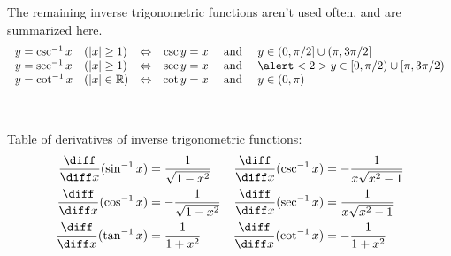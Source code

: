 \begin{frame}
The remaining inverse trigonometric functions aren't used often, and are summarized here.
\[
\begin{array}{llcrcl}
y = \csc^{-1} x &%
(|x| \geq 1) &%
\Leftrightarrow &%
\csc y = x &%
\text{ and } &%
y\in (0,\pi /2] \cup (\pi , 3\pi /2] \\%
y = \sec^{-1} x &%
(|x| \geq 1) &%
\Leftrightarrow &%
\sec y = x &%
\text{ and } &%
\alert<2>{y\in [0,\pi /2) \cup [\pi , 3\pi /2)} \\%
y = \cot^{-1} x &%
(|x| \in \mathbb{R}) &%
\Leftrightarrow &%
\cot y = x &%
\text{ and } &%
y\in (0,\pi )
\end{array}
\]

\ %
%
\end{frame}

\begin{frame}
Table of derivatives of inverse trigonometric functions: 
\begin{align*}
\frac{\diff}{\diff x} (\sin^{-1} x) & = %
\frac{1}{\sqrt{1-x^2}} &%
\frac{\diff}{\diff x} (\csc^{-1} x) & = %
-\frac{1}{x\sqrt{x^2-1}} \\%
\frac{\diff}{\diff x} (\cos^{-1} x) & = %
-\frac{1}{\sqrt{1-x^2}} &%
\frac{\diff}{\diff x} (\sec^{-1} x) & = %
\frac{1}{x\sqrt{x^2-1}} \\%
\frac{\diff}{\diff x} (\tan^{-1} x) & = %
\frac{1}{1+x^2} &%
\frac{\diff}{\diff x} (\cot^{-1} x) & = %
-\frac{1}{1+x^2} %
\end{align*}
\end{frame}
